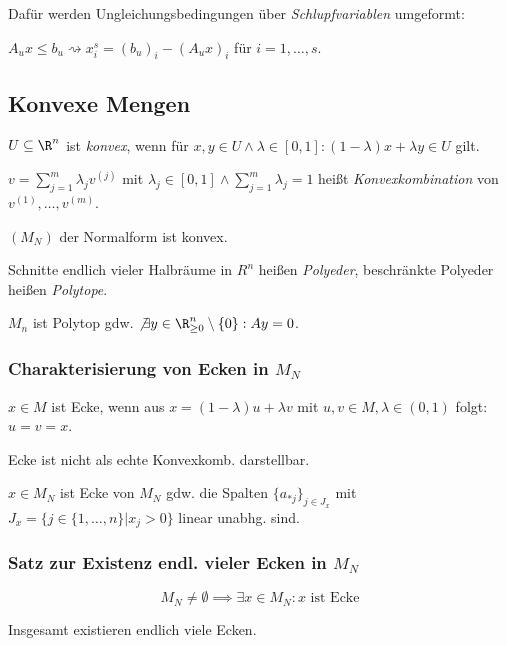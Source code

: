 Dafür werden Ungleichungsbedingungen über \emph{Schlupfvariablen} umgeformt:

\(A_u x \leq b_u \rightsquigarrow x_i^s = (b_u)_i - (A_u x)_i\) für \(i = 1,\dots,s\).

\subsection*{Konvexe Mengen}

\(U \subseteq \R^n\) ist \emph{konvex}, wenn für \(x, y \in U \land \lambda \in [0,1] : (1-\lambda)x + \lambda y \in U\) gilt.

\spacing

\( v = \sum_{j=1}^m \lambda_j v^{(j)} \) mit \( \lambda_j \in [0,1] \land \sum_{j=1}^m \lambda_j = 1\) heißt \emph{Konvexkombination} von \( v^{(1)}, \dots, v^{(m)} \).

\spacing

\((M_N)\) der Normalform ist konvex.

\spacing

Schnitte endlich vieler Halbräume in \(R^n\) heißen \emph{Polyeder}, beschränkte Polyeder heißen \emph{Polytope}.

\spacing

\(M_n\) ist Polytop gdw. \( \not\exists y \in \R_{\geq 0}^n \setminus \{0\} : Ay = 0 \).

\subsubsection*{Charakterisierung von Ecken in \(M_N\)}

\(x \in M\) ist Ecke, wenn aus \(x=(1-\lambda) u+\lambda v\) mit \(u, v \in M, \lambda \in (0,1)\) folgt: \( u = v = x \).

Ecke ist nicht als echte Konvexkomb. darstellbar.

\spacing

\( x \in M_N \) ist Ecke von \(M_N\) gdw. die Spalten \(\{a_{*j}\}_{j \in J_x}\) mit \(J_x = \{ j \in \{1,\dots,n\} | x_j > 0 \}\) linear unabhg. sind.

\subsubsection*{Satz zur Existenz endl. vieler Ecken in \(M_N\)}

\[ M_N \neq \emptyset \implies \exists x \in M_N : x \text{ ist Ecke} \]

Insgesamt existieren endlich viele Ecken.

